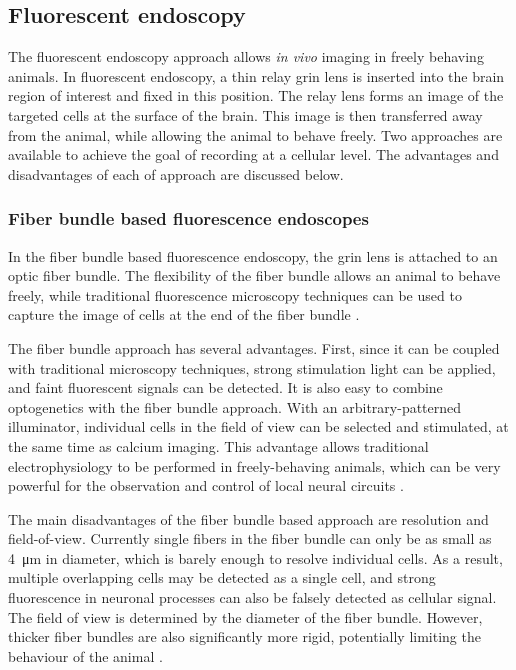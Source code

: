 \subsection{Fluorescent endoscopy}

The fluorescent endoscopy approach allows \textit{in vivo} imaging in freely behaving animals. In fluorescent endoscopy, a thin relay \gls{grin} lens is inserted into the brain region of interest and fixed in this position. The relay lens forms an image of the targeted cells at the surface of the brain. This image is then transferred away from the animal, while allowing the animal to behave freely. Two approaches are available to achieve the goal of recording at a cellular level. The advantages and disadvantages of each of approach are discussed below. 

\subsubsection{Fiber bundle based fluorescence endoscopes}
In the fiber bundle based fluorescence endoscopy, the \gls{grin} lens is attached to an optic fiber bundle. The flexibility of the fiber bundle allows an animal to behave freely, while traditional fluorescence microscopy techniques can be used to capture the image of cells at the end of the fiber bundle \citep{flusberg08}. 

The fiber bundle approach has several advantages. First, since it can be coupled with traditional microscopy techniques, strong stimulation light can be applied, and faint fluorescent signals can be detected. It is also easy to combine optogenetics with the fiber bundle approach. With an arbitrary-patterned illuminator, individual cells in the field of view can be selected and stimulated, at the same time as calcium imaging. This advantage allows traditional electrophysiology to be performed in freely-behaving animals, which can be very powerful for the observation and control of local neural circuits \citep{szabo14}.

The main disadvantages of the fiber bundle based approach are resolution and field-of-view. Currently single fibers in the fiber bundle can only be as small as \SI{4}{\um} in diameter, which is barely enough to resolve individual cells. As a result, multiple overlapping cells may be detected as a single cell, and strong fluorescence in neuronal processes can also be falsely detected as cellular signal. The field of view is determined by the diameter of the fiber bundle. However, thicker fiber bundles are also significantly more rigid, potentially limiting the behaviour of the animal \citep{yang17}. 


